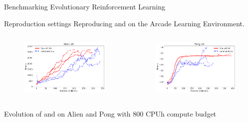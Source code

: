 \begin{frame}{\tcii{} Benchmarking Evolutionary Reinforcement Learning}

    \begin{block}{Reproduction settings}
        Reproducing \canonical{} {\color{lightgray}\canonicalpaper{}} and \openaies{} {\color{lightgray} \openaipaper{}} on the Arcade Learning Environment.
    \end{block}
    
    \begin{columns}
        \begin{column}{0.45\linewidth}
            \begin{center}
                \begin{figure}
                    \includegraphics[width=.9\linewidth]{images/BERL/Alien-v0.png}
                \end{figure}
            \end{center}
        \end{column}
        
        \begin{column}{0.45\linewidth}
            \begin{center}
                \begin{figure}
                    \includegraphics[width=.9\linewidth]{images/BERL/Pong-v0.png}
                \end{figure}
            \end{center}
        \end{column}
    \end{columns}
    \begin{center}
        \small Evolution of \canonical{} and \openaies{} on Alien and Pong with 800 CPUh compute budget
    \end{center}

    

\end{frame}